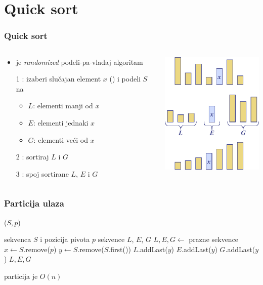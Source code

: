\documentclass[compress,aspectratio=169]{beamer}
\begin{document}
\section[Quick sort]{Quick sort}

\begin{frame}[fragile]
  \frametitle{Quick sort}
  \begin{columns}
    \begin{column}[t]{6cm}
      \begin{itemize}
        \item {} je \textit{randomized} podeli-pa-vladaj algoritam
        \item[1] : izaberi slučajan element $x$ () i podeli $S$ na
        \begin{itemize}
          \item $L$: elementi manji od $x$
          \item $E$: elementi jednaki $x$
          \item $G$: elementi veći od $x$
        \end{itemize}    
        \item[2] : sortiraj $L$ i $G$
        \item[3] : spoj sortirane $L$, $E$ i $G$
      \end{itemize}    
    \end{column}
    \begin{column}[t]{6cm}
      \begin{center}
        \includegraphics[width=5cm]{asp-12-pic14.png}
      \end{center}
    \end{column}
  \end{columns}
\end{frame}

\begin{frame}
  \frametitle{Particija ulaza}
  ($S, p$)
  \begin{algorithmic}
    \REQUIRE sekvenca $S$ i pozicija pivota $p$
    \ENSURE sekvence $L$, $E$, $G$
    \STATE $L,E,G \leftarrow$ prazne sekvence
    \STATE $x \leftarrow S$.remove($p$) 
      \STATE $y \leftarrow S$.remove($S$.first())
        \STATE $L$.addLast($y$)
        \STATE $E$.addLast($y$)
      \ELSE 
        \STATE $G$.addLast($y$)
      \ENDIF
    \ENDWHILE
    \RETURN $L,E,G$
  \end{algorithmic}
  \hfill particija je $O(n)$    
\end{frame}
\end{document}
